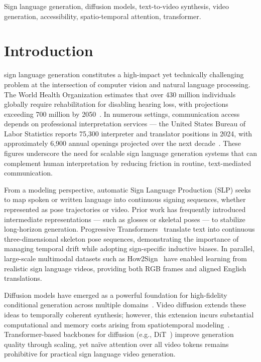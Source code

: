 \documentclass{ieeeaccess}
\begin{document}
\begin{keywords}
Sign language generation, diffusion models, text-to-video synthesis, video generation, accessibility, spatio-temporal attention, transformer.
\end{keywords}

\titlepgskip=-21pt

\maketitle

\section{Introduction}
\label{sec:introduction}

 sign language generation constitutes a high-impact yet technically challenging problem at the intersection of computer vision and natural language processing. The World Health Organization estimates that over 430 million individuals globally require rehabilitation for disabling hearing loss, with projections exceeding 700 million by 2050~\cite{who2025deafness}. In numerous settings, communication access depends on professional interpretation services — the United States Bureau of Labor Statistics reports 75,300 interpreter and translator positions in 2024, with approximately 6,900 annual openings projected over the next decade~\cite{bls2025interpreters}. These figures underscore the need for scalable sign language generation systems that can complement human interpretation by reducing friction in routine, text-mediated communication.

From a modeling perspective, automatic Sign Language Production (SLP) seeks to map spoken or written language into continuous signing sequences, whether represented as pose trajectories or video. Prior work has frequently introduced intermediate representations — such as glosses or skeletal poses — to stabilize long-horizon generation. Progressive Transformers~\cite{saunders2020progressive} translate text into continuous three-dimensional skeleton pose sequences, demonstrating the importance of managing temporal drift while adopting sign-specific inductive biases. In parallel, large-scale multimodal datasets such as How2Sign~\cite{duarte2021how2sign} have enabled learning from realistic sign language videos, providing both RGB frames and aligned English translations.

Diffusion models have emerged as a powerful foundation for high-fidelity conditional generation across multiple domains~\cite{ho2020ddpm, rombach2022ldm}. Video diffusion extends these ideas to temporally coherent synthesis; however, this extension incurs substantial computational and memory costs arising from spatiotemporal modeling~\cite{ho2022videodiffusion}. Transformer-based backbones for diffusion (e.g., DiT~\cite{peebles2023dit}) improve generation quality through scaling, yet na\"{i}ve attention over all video tokens remains prohibitive for practical sign language video generation.
\end{document}
